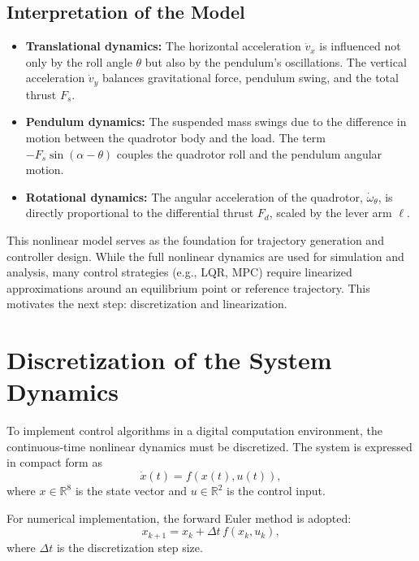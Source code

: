 \documentclass[a4paper,11pt,oneside]{book}
\begin{document}
\subsection*{Interpretation of the Model}

\begin{itemize}
    \item \textbf{Translational dynamics:} The horizontal acceleration $\dot{v}_x$ is influenced not only by the roll angle $\theta$ but also by the pendulum’s oscillations. 
    The vertical acceleration $\dot{v}_y$ balances gravitational force, pendulum swing, and the total thrust $F_s$.  

    \item \textbf{Pendulum dynamics:} The suspended mass swings due to the difference in motion between the quadrotor body and the load. 
    The term $-F_s \sin(\alpha - \theta)$ couples the quadrotor roll and the pendulum angular motion.  

    \item \textbf{Rotational dynamics:} The angular acceleration of the quadrotor, $\dot{\omega}_\theta$, is directly proportional to the differential thrust $F_d$, 
    scaled by the lever arm $\ell$.  
\end{itemize}


This nonlinear model serves as the foundation for trajectory generation and controller design. While the full nonlinear dynamics are used for simulation and analysis, 
many control strategies (e.g., LQR, MPC) require linearized approximations around an equilibrium point or reference trajectory. 
This motivates the next step: discretization and linearization.

\section{Discretization of the System Dynamics}
\label{sec:Discretization}

To implement control algorithms in a digital computation environment, 
the continuous-time nonlinear dynamics must be discretized. 
The system is expressed in compact form as
\begin{equation}
\dot{x}(t) = f(x(t), u(t)),
\end{equation}
where $x \in \mathbb{R}^8$ is the state vector and $u \in \mathbb{R}^2$ is the control input.  

For numerical implementation, the forward Euler method is adopted:
\begin{equation}
x_{k+1} = x_k + \Delta t \, f(x_k, u_k),
\end{equation}
where $\Delta t$ is the discretization step size.  
\end{document}
